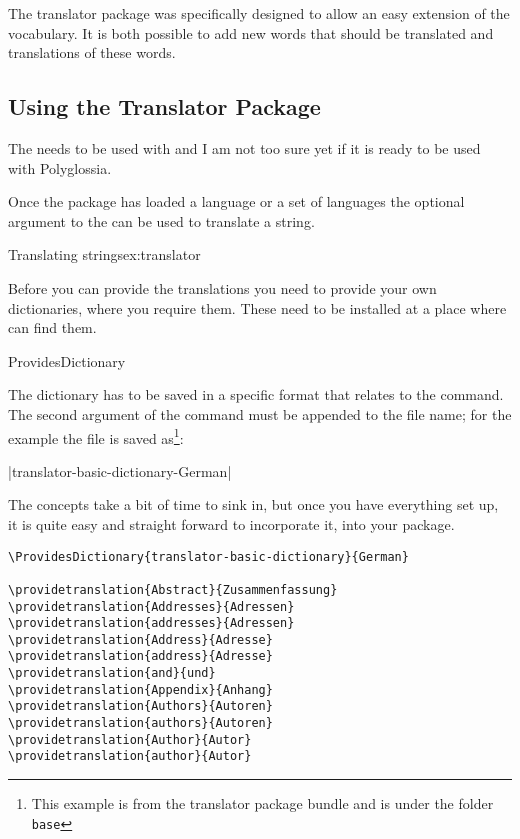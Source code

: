 The translator package was specifically designed to allow an easy
extension of the vocabulary. It is both possible to add new words that
should be translated and translations of these words.

\subsection{Using the Translator Package}

  The  needs to be used with  and I am not too sure yet 
  if it is ready  to be used with Polyglossia.

Once the package has loaded a language or a set of languages the optional argument to the
\cmd{\translate} can be used to translate a string. 

\begin{texexample}{Translating strings}{ex:translator}
\end{texexample}

Before you can provide the translations you need to provide your own dictionaries, where you require them. These need to be installed at a place where \tex can find them.

\begin{docCmd} {ProvidesDictionary} {   }
\end{docCmd}

The dictionary has to be saved in a specific format that relates to the  command. The second argument of the command must be appended to the file name; for the example the file is saved as\footnote{This  example is from the translator package bundle and is under the folder \texttt{base}}:

|translator-basic-dictionary-German|

The concepts take a bit of time to sink in, but once you have everything set up, it is quite easy and straight forward to incorporate it, into your package. 

\begin{verbatim}
\ProvidesDictionary{translator-basic-dictionary}{German}

\providetranslation{Abstract}{Zusammenfassung}
\providetranslation{Addresses}{Adressen}
\providetranslation{addresses}{Adressen}
\providetranslation{Address}{Adresse}
\providetranslation{address}{Adresse}
\providetranslation{and}{und}
\providetranslation{Appendix}{Anhang}
\providetranslation{Authors}{Autoren}
\providetranslation{authors}{Autoren}
\providetranslation{Author}{Autor}
\providetranslation{author}{Autor}
\end{verbatim} 

